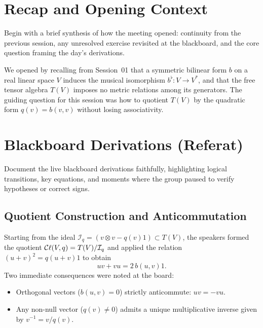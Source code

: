 \documentclass[11pt,a4paper]{article}
\begin{document}
\makeseminarheader

\section{Recap and Opening Context}
\label{sec:recap}

Begin with a brief synthesis of how the meeting opened: continuity from the
previous session, any unresolved exercise revisited at the blackboard, and
the core question framing the day's derivations.

We opened by recalling from Session~01 that a symmetric bilinear form $b$ on
a real linear space $V$ induces the musical isomorphism $b^\flat : V \to V^*$,
and that the free tensor algebra $T(V)$ imposes no metric relations among its
generators. The guiding question for this session was how to quotient $T(V)$
by the quadratic form $q(v) = b(v, v)$ without losing associativity.

\section{Blackboard Derivations (Referat)}
\label{sec:derivations}

Document the live blackboard derivations faithfully, highlighting logical
transitions, key equations, and moments where the group paused to verify
hypotheses or correct signs.

\subsection{Quotient Construction and Anticommutation}
\label{subsec:quotient}

Starting from the ideal $\mathcal{I}_q = ( v \otimes v - q(v) 1 )
\subset T(V)$, the speakers formed the quotient $\mathcal{C}\ell(V,q) = T(V)/\mathcal{I}_q$
and applied the relation $(u + v)^2 = q(u + v) 1$ to obtain
\begin{equation}
  \label{eq:proto-polarization}
  uv + vu = 2\, b(u, v) 1.
\end{equation}
Two immediate consequences were noted at the board:
\begin{itemize}
  \item Orthogonal vectors ($b(u,v) = 0$) strictly anticommute: $uv = -vu$.
  \item Any non-null vector ($q(v) \neq 0$) admits a unique multiplicative
    inverse given by $v^{-1} = v / q(v)$.
\end{itemize}
\end{document}
